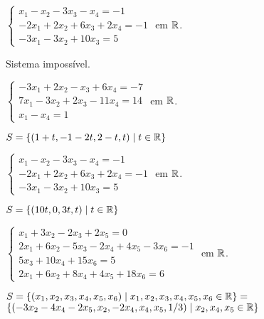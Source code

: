 \documentclass[12pt]{exam}
\begin{document}
\begin{exercicio}
    $
        \begin{cases}
            x_1 - x_2 - 3x_3 - x_4 = -1\\
            -2x_1 + 2x_2 + 6x_3 + 2x_4 = -1\\
            -3x_1 - 3x_2 + 10x_3 = 5
        \end{cases}
    $
    em $\mathbb{R}$.
    \begin{solucao}
        Sistema impossível.
    \end{solucao}
\end{exercicio}

\begin{exercicio}
    $
        \begin{cases}
            -3x_1 + 2x_2 - x_3 + 6x_4 = -7\\
            7x_1 - 3x_2 + 2x_3 - 11x_4 = 14\\
            x_1 - x_4 = 1
        \end{cases}
    $
    em $\mathbb{R}$.
    \begin{solucao}
        $S = \{(1 + t, -1 - 2t, 2 - t, t) \mid t \in \mathbb{R}\}$
    \end{solucao}
\end{exercicio}

\begin{exercicio}
    $
    \begin{cases}
        x_1 - x_2 - 3x_3 - x_4 = -1\\
        -2x_1 + 2x_2 + 6x_3 + 2x_4 = -1\\
        -3x_1 - 3x_2 + 10x_3 = 5
    \end{cases}
    $
    em $\mathbb{R}$.
    \begin{solucao}
        $S = \{(10t, 0, 3t, t) \mid t \in \mathbb{R}\}$
    \end{solucao}
\end{exercicio}

\begin{exercicio}
    $
        \begin{cases}
            x_1 + 3x_2 - 2x_3 + 2x_5 = 0\\
            2x_1 + 6x_2 - 5x_3 - 2x_4 + 4x_5 - 3x_6 = -1\\
            5x_3 + 10x_4 + 15x_6 = 5\\
            2x_1 + 6x_2 + 8x_4 + 4x_5 + 18x_6 = 6
        \end{cases}
    $
    em $\mathbb{R}$.
    \begin{solucao}
        $S = \{(x_1, x_2, x_3, x_4, x_5, x_6) \mid x_1, x_2, x_3, x_4, x_5, x_6 \in \mathbb{R}\} = $\\ $\{(-3x_2 - 4x_4 - 2x_5, x_2, -2x_4, x_4, x_5, 1/3) \mid x_2, x_4, x_5 \in \mathbb{R}\}$
    \end{solucao}
\end{exercicio}
\end{document}
